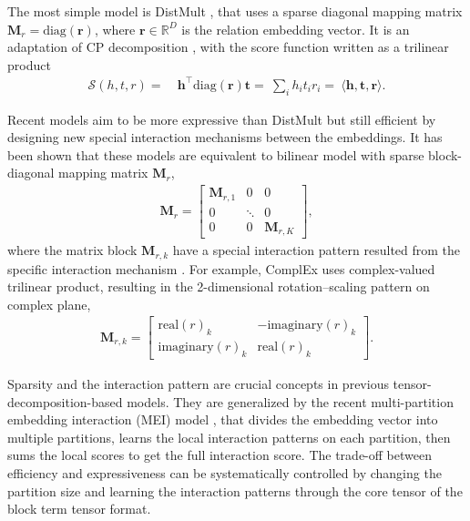 \documentclass{article}
\def\vh{{\bm{h}}}
\def\vr{{\bm{r}}}
\def\vt{{\bm{t}}}
\def\mM{{\bm{M}}}
\def\gS{{\mathcal{S}}}
\def\sR{{\mathbb{R}}}
\newcommand{\diag}{{\text{diag}}} \newcommand{\concat}{{\mathbin{+\mkern-10mu+}}} \newcommand{\horizontalconcat}{{^{\frown}}}
\theoremstyle{plain}
\theoremstyle{remark}
\begin{document}
The most simple model is DistMult \cite{yang_embeddingentitiesrelations_2015}, that uses a sparse diagonal mapping matrix $ \mM_r = \diag(\vr) $, where $ \vr \in \sR^D $ is the relation embedding vector. It is an adaptation of CP decomposition \cite{kolda_tensordecompositionsapplications_2009}, with the score function written as a trilinear product
\begin{align} \label{eq:trilinear}
\gS(h,t,r) =\ &\vh^\top \diag(\vr) \vt =\ \textstyle\sum_i h_i t_i r_i =\ \langle \vh, \vt, \vr \rangle.
\end{align}

Recent models aim to be more expressive than DistMult but still efficient by designing new special interaction mechanisms between the embeddings. It has been shown that these models are equivalent to bilinear model with sparse block-diagonal mapping matrix $ \mM_r $, 
\begin{align} \label{eq:sparsebilinear}
\mM_{r}
= 
\textstyle\begin{bmatrix}
\mM_{r,1} & 0 & 0 \\
0 & \ddots & 0 \\
0 & 0 & \mM_{r,K}
\end{bmatrix},
\end{align}
where the matrix block $ \mM_{r,k} $ have a special interaction pattern resulted from the specific interaction mechanism \cite{tran_multipartitionembeddinginteraction_2020}. For example, ComplEx \cite{trouillon_complexembeddingssimple_2016} uses complex-valued trilinear product, resulting in the 2-dimensional rotation--scaling pattern on complex plane, \begin{align}
\mM_{r,k} = \textstyle\begin{bmatrix} \text{real}(r)_k & - \text{imaginary}(r)_k \\ \text{imaginary}(r)_k & \text{real}(r)_k \end{bmatrix}. 
\end{align}


Sparsity and the interaction pattern are crucial concepts in previous tensor-decomposition-based models. They are generalized by the recent multi-partition embedding interaction (MEI) model \cite{tran_multipartitionembeddinginteraction_2020}, that divides the embedding vector into multiple partitions, learns the local interaction patterns on each partition, then sums the local scores to get the full interaction score. The trade-off between efficiency and expressiveness can be systematically controlled by changing the partition size and learning the interaction patterns through the core tensor of the block term tensor format.
\end{document}
